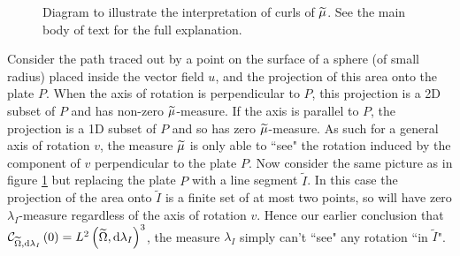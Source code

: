 \begin{figure}[ht]
	\caption{\label{fig:CurlInterpFigure} Diagram to illustrate the interpretation of curls of $\widetilde{\mu}$. See the main body of text for the full explanation.}
\end{figure}
Consider the path traced out by a point on the surface of a sphere (of small radius) placed inside the vector field $u$, and the projection of this area onto the plate $P$. 
When the axis of rotation is perpendicular to $P$, this projection is a 2D subset of $P$ and has non-zero $\widetilde{\mu}$-measure. 
If the axis is parallel to $P$, the projection is a 1D subset of $P$ and so has zero $\widetilde{\mu}$-measure.
As such for a general axis of rotation $v$, the measure $\widetilde{\mu}$ is only able to ``see" the rotation induced by the component of $v$ perpendicular to the plate $P$.
Now consider the same picture as in figure \ref{fig:CurlInterpFigure} but replacing the plate $P$ with a line segment $\widetilde{I}$.
In this case the projection of the area onto $\widetilde{I}$ is a finite set of at most two points, so will have zero $\lambda_I$-measure regardless of the axis of rotation $v$.
Hence our earlier conclusion that $\mathcal{C}_{ \widetilde{\Omega}, \mathrm{d}\lambda_I}\left( 0 \right)=L^{2}\left( \widetilde{\Omega},\mathrm{d}\lambda_I \right)^3$, the measure $\lambda_I$ simply can't ``see" any rotation ``in $\widetilde{I}$".

